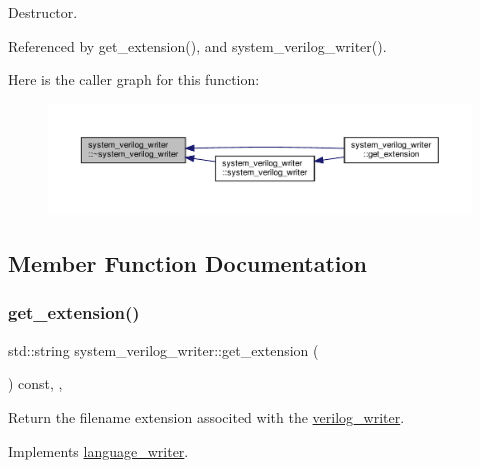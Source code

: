 Destructor. 



Referenced by get\+\_\+extension(), and system\+\_\+verilog\+\_\+writer().

Here is the caller graph for this function\+:
\nopagebreak
\begin{figure}[H]
\begin{center}
\leavevmode
\includegraphics[width=350pt]{d5/d69/classsystem__verilog__writer_a622ed9f43f9cebfa936127d8a333fb53_icgraph}
\end{center}
\end{figure}


\subsection{Member Function Documentation}
\mbox{\label{classsystem__verilog__writer_a7730b4c523fbdf8e41c4416775194b2f}} 
\subsubsection{\texorpdfstring{get\+\_\+extension()}{get\_extension()}}
{\footnotesize\ttfamily std\+::string system\+\_\+verilog\+\_\+writer\+::get\+\_\+extension (\begin{DoxyParamCaption}{ }\end{DoxyParamCaption}) const\hspace{0.3cm}{\ttfamily [inline]}, {\ttfamily [override]}, {\ttfamily [virtual]}}



Return the filename extension associted with the \hyperlink{classverilog__writer}{verilog\+\_\+writer}. 



Implements \hyperlink{classlanguage__writer_a3bcb9c84b283d53ecc1f3c4ee8e9dc38}{language\+\_\+writer}.



